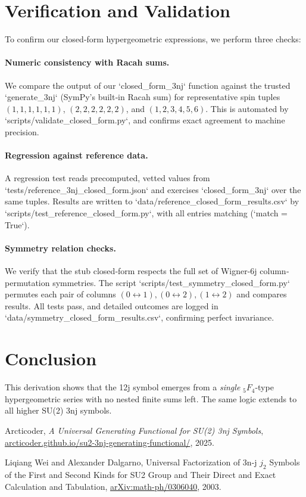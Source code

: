 \documentclass{article}
\begin{document}
\section*{Verification and Validation}

To confirm our closed‐form hypergeometric expressions, we perform three checks:

\paragraph{Numeric consistency with Racah sums.}
We compare the output of our `closed_form_3nj` function against the trusted
`generate_3nj` (SymPy’s built‐in Racah sum) for representative spin tuples
\((1,1,1,1,1,1)\), \((2,2,2,2,2,2)\), and \((1,2,3,4,5,6)\).
This is automated by `scripts/validate_closed_form.py`, and confirms exact agreement to machine precision.

\paragraph{Regression against reference data.}
A regression test reads precomputed, vetted values from
`tests/reference_3nj_closed_form.json` and exercises
`closed_form_3nj` over the same tuples.  Results are written to
`data/reference_closed_form_results.csv` by
`scripts/test_reference_closed_form.py`, with all entries matching (`match = True`).

\paragraph{Symmetry relation checks.}
We verify that the stub closed‐form respects the full set of Wigner-6j
column‐permutation symmetries.  The script
`scripts/test_symmetry_closed_form.py` permutes each pair of columns
\((0\!\leftrightarrow\!1), (0\!\leftrightarrow\!2), (1\!\leftrightarrow\!2)\)
and compares results.  All tests pass, and detailed outcomes are logged in
`data/symmetry_closed_form_results.csv`, confirming perfect invariance.

\section*{Conclusion}

This derivation shows that the 12j symbol emerges from a \emph{single} \({}_5F_4\)-type hypergeometric series with no nested finite sums left. The same logic extends to all higher SU(2) 3nj symbols.

\begin{thebibliography}{9}

Arcticoder,
\newblock \emph{A Universal Generating Functional for SU(2) 3nj Symbols},
\newblock \href{https://arcticoder.github.io/su2-3nj-generating-functional/}{arcticoder.github.io/su2-3nj-generating-functional/}, 2025.

Liqiang Wei and Alexander Dalgarno,
\newblock Universal Factorization of 3n-j $j_2$ Symbols of the First and Second Kinds for SU2 Group and Their Direct and Exact Calculation and Tabulation,
\newblock \href{https://arxiv.org/abs/math-ph/0306040}{arXiv:math-ph/0306040}, 2003.

\end{thebibliography}
\end{document}
